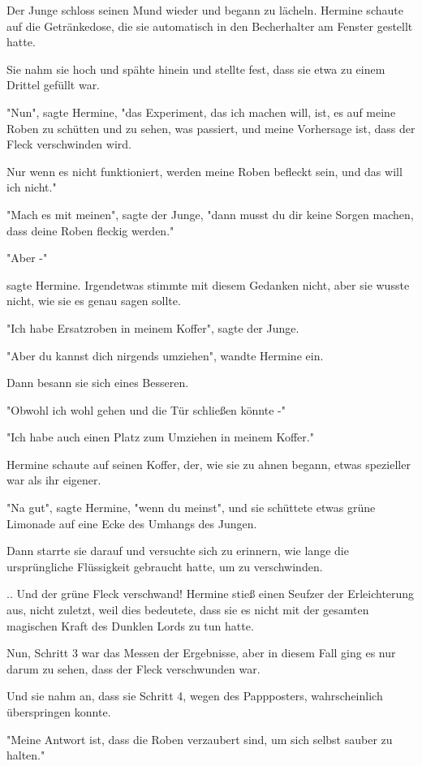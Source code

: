 {Der Junge schloss seinen Mund wieder und begann zu lächeln. Hermine schaute auf die Getränkedose, die sie automatisch in den Becherhalter am Fenster gestellt hatte.

Sie nahm sie hoch und spähte hinein und stellte fest, dass sie etwa zu einem Drittel gefüllt war.

"Nun", sagte Hermine, "das Experiment, das ich machen will, ist, es auf meine Roben zu schütten und zu sehen, was passiert, und meine Vorhersage ist, dass der Fleck verschwinden wird.

Nur wenn es nicht funktioniert, werden meine Roben befleckt sein, und das will ich nicht."

"Mach es mit meinen", sagte der Junge, "dann musst du dir keine Sorgen machen, dass deine Roben fleckig werden."

"Aber -"

sagte Hermine. Irgendetwas stimmte mit diesem Gedanken nicht, aber sie wusste nicht, wie sie es genau sagen sollte.

"Ich habe Ersatzroben in meinem Koffer", sagte der Junge.

"Aber du kannst dich nirgends umziehen", wandte Hermine ein.

Dann besann sie sich eines Besseren.

"Obwohl ich wohl gehen und die Tür schließen könnte -"

"Ich habe auch einen Platz zum Umziehen in meinem Koffer."

Hermine schaute auf seinen Koffer, der, wie sie zu ahnen begann, etwas spezieller war als ihr eigener.

"Na gut", sagte Hermine, "wenn du meinst", und sie schüttete etwas grüne Limonade auf eine Ecke des Umhangs des Jungen.

Dann starrte sie darauf und versuchte sich zu erinnern, wie lange die ursprüngliche Flüssigkeit gebraucht hatte, um zu verschwinden.

.. Und der grüne Fleck verschwand! Hermine stieß einen Seufzer der Erleichterung aus, nicht zuletzt, weil dies bedeutete, dass sie es nicht mit der gesamten magischen Kraft des Dunklen Lords zu tun hatte.

Nun, Schritt 3 war das Messen der Ergebnisse, aber in diesem Fall ging es nur darum zu sehen, dass der Fleck verschwunden war.

Und sie nahm an, dass sie Schritt 4, wegen des Pappposters, wahrscheinlich überspringen konnte.

"Meine Antwort ist, dass die Roben verzaubert sind, um sich selbst sauber zu halten."

}
